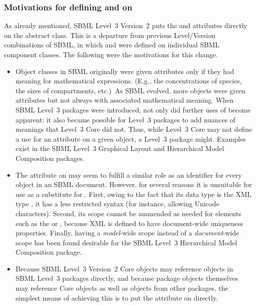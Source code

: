 \begin{blockChanged}

\subsubsection{Motivations for defining  and  on }
\label{sec:why-on-sbase}

As already mentioned, SBML Level~3 Version~2 puts the  and  attributes directly on the \SBase abstract class. This is a departure from previous Level/Version combinations of SBML, in which  and  were defined on individual SBML component classes.  The following were the motivations for this change.
\begin{itemize}
  
\item Object classes in SBML originally were given  attributes only if they had meaning for mathematical expressions.  (E.g., the concentrations of species, the sizes of compartments, etc.)\  As SBML evolved, more objects were given  attributes but not always with associated mathematical meaning.  When SBML Level~3 packages were introduced, not only did further uses of  become apparent: it also became possible for Level~3 packages to add nuances of meanings that Level~3 Core did not.  Thus, while Level~3 Core may not define a use for an  attribute on a given object, a Level~3 package might.  Examples exist in the SBML Level~3 Graphical Layout and Hierarchical Model Composition packages.

\item The  attribute on \SBase may seem to fulfill a similar role as an identifier for every object in an SBML document.  However, for several reasons it is unsuitable for use as a substitute for .  First, owing to the fact that its data type is the XML type , it has a less restricted syntax (for instance, allowing Unicode characters).  Second, its scope cannot be ammended as needed for elements such as the \UnitDefinition or \LocalParameter, because XML  is defined to have document-wide uniqueness properties.  Finally, having a \emph{model}-wide scope instead of a \emph{document}-wide scope has been found desirable for the SBML Level~3 Hierarchical Model Composition package.

\item Because SBML Level~3 Version~2 Core objects may reference objects in  SBML Level~3 packages directly, and because package objects themselves may reference Core objects as well as objects from other packages, the simplest means of achieving this is to put the   attribute on \SBase directly.


\end{itemize}
\end{blockChanged}
